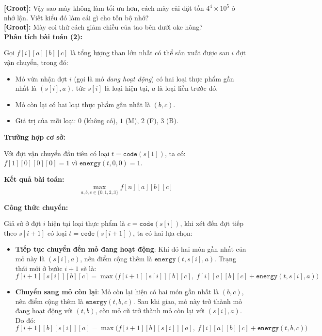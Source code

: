 \textbf{[Groot]:} Vậy sao mày không làm tối ưu hơn, cách mày cài đặt tốn $4^4 \times 10^5$ ô nhớ lận. Viết kiểu đó làm cái gì cho tốn bộ nhớ?\\

\textbf{[Groot]:} Mày coi thử cách giảm chiều của tao bên dưới oke hông?\\

\textbf{Phân tích bài toán (2):}

Gọi $f[i][a][b][c]$ là tổng lượng than lớn nhất có thể sản xuất được sau $i$ đợt vận chuyển, trong đó:
\begin{itemize}
    \item Mỏ vừa nhận đợt $i$ (gọi là mỏ \textit{đang hoạt động}) có hai loại thực phẩm gần nhất là $(s[i], a)$, tức $s[i]$ là loại hiện tại, $a$ là loại liền trước đó.
    \item Mỏ còn lại có hai loại thực phẩm gần nhất là $(b, c)$.
    \item Giá trị của mỗi loại: $0$ (không có), $1$ (M), $2$ (F), $3$ (B).
\end{itemize}

\textbf{Trường hợp cơ sở:}

Với đợt vận chuyển đầu tiên có loại $t = \texttt{code}(s[1])$, ta có: $f[1][0][0][0] = 1$
vì $\texttt{energy}(t,0,0) = 1$.


\textbf{Kết quả bài toán:} 
\[
\max_{a,b,c \in \{0,1,2,3\}} f[n][a][b][c]
\]


\textbf{Công thức chuyển:}

Giả sử ở đợt $i$ hiện tại loại thực phẩm là $c = \texttt{code}(s[i])$, khi xét đến đợt tiếp theo $s[i+1]$ có loại $t = \texttt{code}(s[i+1])$, ta có hai lựa chọn:

\begin{itemize}
    \item \textbf{Tiếp tục chuyển đến mỏ đang hoạt động}:  
    Khi đó hai món gần nhất của mỏ này là $(s[i], a)$, nên điểm cộng thêm là $\texttt{energy}(t, s[i], a)$.  
    Trạng thái mới ở bước $i+1$ sẽ là:
    \[
    f[i+1][s[i]][b][c] = \max\Big(f[i+1][s[i]][b][c],\; f[i][a][b][c] + \texttt{energy}(t, s[i], a)\Big)
    \]

    \item \textbf{Chuyển sang mỏ còn lại}:  
    Mỏ còn lại hiện có hai món gần nhất là $(b, c)$, nên điểm cộng thêm là $\texttt{energy}(t, b, c)$.  
    Sau khi giao, mỏ này trở thành mỏ đang hoạt động với $(t, b)$, còn mỏ cũ trở thành mỏ còn lại với $(s[i], a)$.  
    Do đó:
    \[
    f[i+1][b][s[i]][a] = \max\Big(f[i+1][b][s[i]][a],\; f[i][a][b][c] + \texttt{energy}(t, b, c)\Big)
    \]
\end{itemize}



